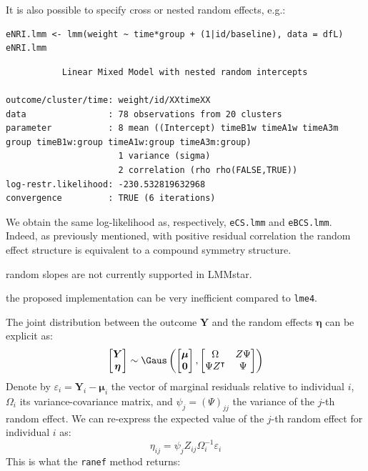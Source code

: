\documentclass[12pt]{article}
\newcommand\Warning[1][3ex]{%
\renewcommand\stacktype{L}%
\scaleto{\stackon[1.3pt]{\color{red}$\triangle$}{\tiny\bfseries !}}{#1}%
\xspace
}
\newcommand\trans[1]{{#1}^\intercal}%
\newcommand\Veta{\boldsymbol{\eta}}
\newcommand{\VY}{\boldsymbol{Y}}
\begin{document}
It is also possible to specify cross or nested random effects, e.g.:

\lstset{language=r,label= ,caption= ,captionpos=b,numbers=none}
\begin{lstlisting}
eNRI.lmm <- lmm(weight ~ time*group + (1|id/baseline), data = dfL)
eNRI.lmm
\end{lstlisting}

\begin{verbatim}
	       Linear Mixed Model with nested random intercepts 

outcome/cluster/time: weight/id/XXtimeXX 
data                : 78 observations from 20 clusters 
parameter           : 8 mean ((Intercept) timeB1w timeA1w timeA3m group timeB1w:group timeA1w:group timeA3m:group) 
                      1 variance (sigma) 
                      2 correlation (rho rho(FALSE,TRUE)) 
log-restr.likelihood: -230.532819632968 
convergence         : TRUE (6 iterations)
\end{verbatim}


We obtain the same log-likelihood as, respectively, \texttt{eCS.lmm} and
\texttt{eBCS.lmm}. Indeed, as previously mentioned, with positive residual
correlation the random effect structure is equivalent to a compound
symmetry structure. \newline \Warning random slopes are not currently
supported in LMMstar. \newline \Warning the proposed implementation can
be very inefficient compared to \texttt{lme4}.

\bigskip

The joint distribution between the outcome \(\VY\)
and the random effects \(\Veta\) can be explicit as:
\[
\begin{bmatrix} \VY \\ \Veta \end{bmatrix} \sim \Gaus\left(\begin{bmatrix} \boldsymbol{\mu} \\ \mathbf{0} \end{bmatrix}, \begin{bmatrix} \Omega & Z \Psi \\ \Psi \trans{Z} & \Psi \end{bmatrix}\right)
\]
Denote by \(\varepsilon_i=\VY_i-\boldsymbol{\mu}_i\) the vector of
marginal residuals relative to individual \(i\), \(\Omega_i\) its
variance-covariance matrix, and \(\psi_j=(\Psi)_{jj}\) the variance of the
\(j\)-th random effect. We can re-express the expected value of the
\(j\)-th random effect for individual \(i\) as:
\[ \eta_{ij} = \psi_{j} Z_{ij} \Omega_i^{-1}\varepsilon_i \]
This is what the \texttt{ranef} method returns:
\end{document}
